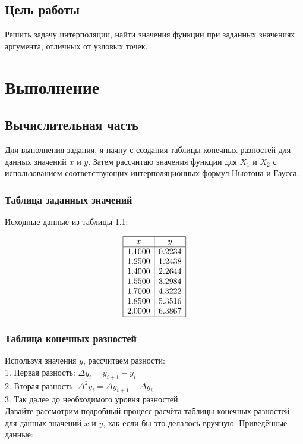 \documentclass{article}
\begin{document}
\subsection{Цель работы}
      Решить задачу интерполяции, найти значения функции при заданных значениях аргумента, отличных от узловых точек.



\section{Выполнение}
      
      \subsection{Вычислительная часть}

      Для выполнения задания, я начну с создания таблицы конечных разностей для данных значений \( x \) и \( y \). Затем рассчитаю значения функции для \( X_1 \) и \( X_2 \) с использованием соответствующих интерполяционных формул Ньютона и Гаусса.

            \subsubsection{Таблица заданных значений}
                  Исходные данные из таблицы 1.1:

                  \[
                  \begin{array}{|c|c|}
                  \hline
                  x & y \\
                  \hline
                  1.1000 & 0.2234 \\
                  1.2500 & 1.2438 \\
                  1.4000 & 2.2644 \\
                  1.5500 & 3.2984 \\
                  1.7000 & 4.3222 \\
                  1.8500 & 5.3516 \\
                  2.0000 & 6.3867 \\
                  \hline
                  \end{array}
                  \]

            \subsubsection{Таблица конечных разностей}
                  Используя значения \( y \), рассчитаем разности:
                  \\
                  1. Первая разность: \(\Delta y_i = y_{i+1} - y_i\) \\
                  2. Вторая разность: \(\Delta^2 y_i = \Delta y_{i+1} - \Delta y_i\) \\
                  3. Так далее до необходимого уровня разностей.
                  \\
                  Давайте рассмотрим подробный процесс расчёта таблицы конечных разностей для данных значений \(x\) и \(y\), как если бы это делалось вручную. Приведённые данные:
\end{document}
